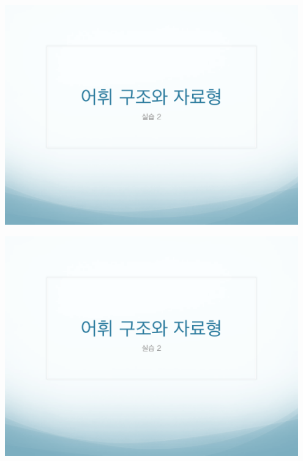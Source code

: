 \documentclass[12pt,a4paper]{article}
\begin{document}
\includegraphics[page=7, width=0.95\textwidth]{2.pdf}

\includegraphics[page=8, width=0.95\textwidth]{2.pdf}
\end{document}
